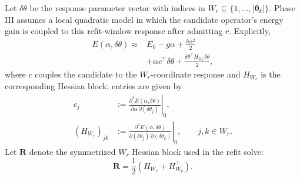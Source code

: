 \documentclass[
  reprint,
  amsmath,
  amssymb,
  aps,
  pra,
  nofootinbib,
  superscriptaddress,
  floatfix
]{revtex4-2}
\begin{document}
Let $\delta\theta$ be the response parameter vector with indices in \(W_r\subseteq\{1,\ldots,|\boldsymbol{\theta}_k|\}\). Phase III assumes a local quadratic model in which the candidate operator's energy gain is coupled to this refit-window response after admitting $r$.
Explicitly, 
\begin{equation}
\begin{split}
E(\alpha,\delta\theta)\approx{}&E_0-g\alpha+\frac{h\alpha^2}{2} \\
&+\alpha c^{\top}\delta\theta
+\frac{\delta\theta^{\top}H_{W_r}\delta\theta}{2},
\end{split}
\label{eq:local_quadratic}
\end{equation}
where $c$ couples the candidate to the \(W_r\)-coordinate response and $H_{W_r}$ is the corresponding Hessian block; entries are given by
\begin{equation}
\begin{aligned}
c_j&:=
\left.
\frac{\partial^2E(\alpha,\delta\theta)}
{\partial\alpha\,\partial(\delta\theta_j)}
\right|_0,\\
(H_{W_r})_{jk}&:=
\left.
\frac{\partial^2E(\alpha,\delta\theta)}
{\partial(\delta\theta_j)\,\partial(\delta\theta_k)}
\right|_0,
\qquad j,k\in W_r .
\end{aligned}
\label{eq:phase3_window_derivatives}
\end{equation}
Let \(\mathbf R\) denote the symmetrized \(W_r\) Hessian block used in the refit solve:
\begin{equation}
\mathbf R=\frac12(H_{W_r}+H_{W_r}^{\top}).
\label{eq:phase3_regularized_hessian}
\end{equation}
\end{document}
